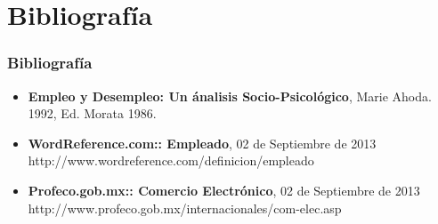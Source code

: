 \section{Bibliografía}
\frame
{
  \frametitle{Bibliografía}
  
	\begin{itemize}
	\item \textbf{Empleo y Desempleo: Un ánalisis Socio-Psicológico}, Marie Ahoda. 1992, Ed. Morata 1986.
	\item \textbf{WordReference.com:: Empleado}, 02 de Septiembre de 2013
	\newline http://www.wordreference.com/definicion/empleado
	
	\item \textbf{Profeco.gob.mx:: Comercio Electrónico}, 02 de Septiembre de 2013
	\newline http://www.profeco.gob.mx/internacionales/com-elec.asp

\end{itemize}


} 
 






